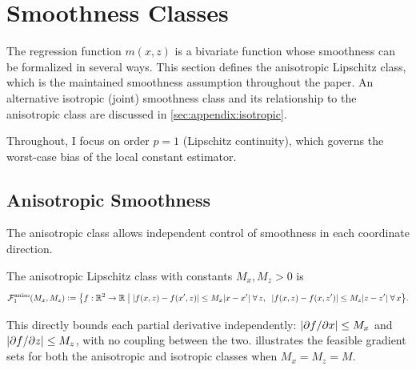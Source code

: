 \section{Smoothness Classes}\label{sec:smoothness}

The regression function $m(x,z)$ is a bivariate function whose smoothness can be formalized in several ways.
This section defines the anisotropic Lipschitz class, which is the maintained smoothness assumption throughout the paper.
An alternative isotropic (joint) smoothness class and its relationship to the anisotropic class are discussed in \cref{sec:appendix:isotropic}.

Throughout, I focus on order $p = 1$ (Lipschitz continuity), which governs the worst-case bias of the local constant estimator.


\subsection{Anisotropic Smoothness}\label{sec:smoothness:anisotropic}

The anisotropic class allows independent control of smoothness in each coordinate direction.

\begin{definition}\label{def:anisotropic}
	The anisotropic Lipschitz class with constants $M_x, M_z > 0$ is
	\begin{equation}\label{eq:anisotropic}
		\mathcal{F}_1^{\mathrm{aniso}}(M_x, M_z) \vcentcolon= \bigl\{ f : \mathbb{R}^2 \to \mathbb{R} \;\big|\; \lvert f(x,z) - f(x',z)\rvert \leq M_x\lvert x - x'\rvert \;\forall\, z, \;\; \lvert f(x,z) - f(x,z')\rvert \leq M_z\lvert z - z'\rvert \;\forall\, x \bigr\}.
	\end{equation}
\end{definition}

This directly bounds each partial derivative independently: $\lvert\partial f / \partial x\rvert \leq M_x$ and $\lvert\partial f / \partial z\rvert \leq M_z$, with no coupling between the two.
 illustrates the feasible gradient sets for both the anisotropic and isotropic classes when $M_x = M_z = M$.




